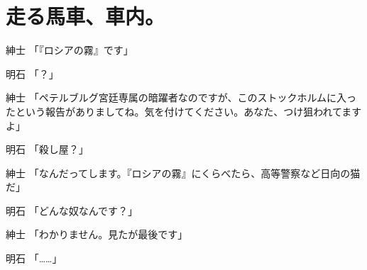 \section*{走る馬車、車内。}

紳士	「『ロシアの霧』です」

明石	「？」

紳士	「ペテルブルグ宮廷専属の暗躍者なのですが、このストックホルムに入ったという報告がありましてね。気を付けてください。あなた、つけ狙われてますよ」

明石	「殺し屋？」

紳士	「なんだってします。『ロシアの霧』にくらべたら、高等警察など日向の猫だ」

明石	「どんな奴なんです？」

紳士	「わかりません。見たが最後です」

明石	「……」
